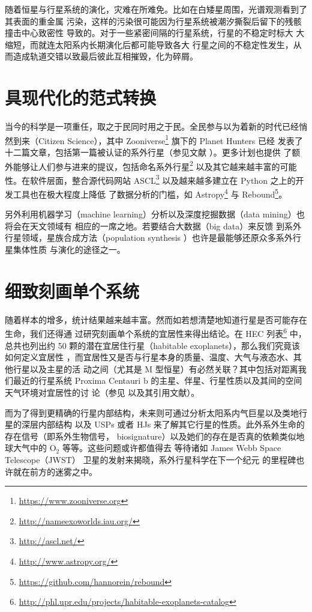 随着恒星与行星系统的演化，灾难在所难免。比如在白矮星周围，光谱观测看到了其表面的重金属
污染\cite{Barstow2014}，这样的污染很可能因为行星系统被潮汐撕裂后留下的残骸撞击中心致密性
导致的\cite{Vanderburg2015,Boyajian2016}。对于一些紧密间隔的行星系统，行星的不稳定时标大
大缩短\cite{Lissauer2011,Lovis2011,MacDonald2016}，而就连太阳系内长期演化后都可能导致各大
行星之间的不稳定性发生，从而造成轨道交错以致最后彼此互相摧毁，化为碎屑\cite{Laskar1988,Laskar1990}。


\section{具现代化的范式转换}

当今的科学是一项重任，取之于民同时用之于民。全民参与以为着新的时代已经悄然到来（Citizen 
Science），其中 Zooniverse\footnote{\url{https://www.zooniverse.org}} 旗下的 Planet Hunters 已经
发表了十二篇文章，包括第一篇被认证的系外行星（参见文献  ）。更多计划也提供
了额外能够让人们参与进来的提议，包括命名系外行星\footnote{\url{http://nameexoworlds.iau.org/}}
以及其它越来越丰富的可能性\cite{Hessman2010,Marshall2015}。在软件层面，整合源代码网站 
ASCL\footnote{\url{http://ascl.net/}} 以及越来越多建立在 Python 之上的开发工具也在极大程度上降低
了数据分析的门槛，如 Astropy\footnote{\url{http://www.astropy.org/}} 与 
Rebound\footnote{\url{https://github.com/hannorein/rebound}}。

另外利用机器学习（machine learning）分析以及深度挖掘数据（data mining）也将会在天文领域有
相应的一席之地\cite{Ball2010,McCauliff2015,Thompson2015}。若要结合大数据（big data）来反馈
到系外行星领域，星族合成方法（population synthesis ）也许是最能够还原众多系外行星集体性质
与演化的途径之一\cite{Benz2014,Mordasini2009}。

\section{细致刻画单个系统}

随着样本的增多，统计结果越来越丰富。然而如若想清楚地知道行星是否可能存在生命，我们还得通
过研究刻画单个系统的宜居性来得出结论。在 HEC 列表\footnote{\url{http://phl.upr.edu/projects/habitable-exoplanets-catalog}}
中，总共也列出约 50 颗的潜在宜居住行星（habitable exoplanets），那么我们究竟该如何定义宜居性
\cite{Kasting1993}，而宜居性又是否与行星本身的质量、温度、大气与液态水、其他行星以及主星的活
动之间（尤其是 M 型恒星）有必然关联\cite{Kasting2003,Segura2005,Scalo2007}？其中包括对距离我
们最近的行星系统 Proxima Centauri b 的主星、伴星、行星性质以及其间的空间天气环境对宜居性的讨
论（参见  以及其引用文献）。

而为了得到更精确的行星内部结构，未来则可通过分析太阳系内气巨星以及类地行星的深层内部结构
以及 USPs 或者 HJs 来了解其它行星的性质。此外系外生命的存在信号（即系外生物信号，
biosignature）以及她们的存在是否真的依赖类似地球大气中的 O$_2$ 等等。这些问题或许都值得去
等待诸如 James Webb Space Telescope（JWST） 卫星的发射来揭晓，系外行星科学在下一个纪元
的里程碑也许就在前方的迷雾之中。









